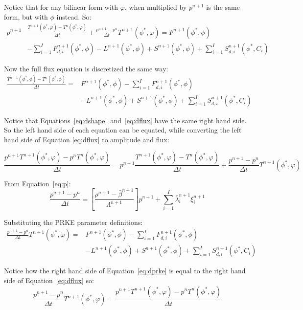 \documentclass[11pt]{tamurmemo}
\newcommand{\be}{\begin{equation}}
\newcommand{\ee}{\end{equation}}
\begin{document}
Notice that for any bilinear form with $\varphi$, when multiplied by $p^{n+1}$ is the same form, but with $\phi$ instead. So:
\begin{align}
p^{n+1}&\frac{T^{n+1}(\phi^{*},\varphi)-T^{n}(\phi^{*},\varphi)}{\Delta t} + \frac{p^{n+1} - p^n}{\Delta t}T^{n+1}(\phi^{*},\varphi)= F^{n+1}(\phi^{*},\phi)  \nonumber \\
&- \sum_{i=1}^I F_{d,i}^{n+1}(\phi^{*},\phi) - L^{n+1}(\phi^{*},\phi) + S^{n+1}(\phi^{*},\phi) + \sum_{i=1}^I S_{d,i}^{n+1}(\phi^{*},C_i)
\label{eq:dshape}
\end{align}

Now the full flux equation is discretized the same way:
\begin{align}
\frac{T^{n+1}(\phi^{*},\phi)-T^{n}(\phi^{*},\phi)}{\Delta t} =& F^{n+1}(\phi^{*},\phi)- \sum_{i=1}^I F_{d,i}^{n+1}(\phi^{*},\phi) \nonumber \\
& - L^{n+1}(\phi^{*},\phi) + S^{n+1}(\phi^{*},\phi) + \sum_{i=1}^I S_{d,i}^{n+1}(\phi^{*},C_i)
\label{eq:dflux}
\end{align}

Notice that Equations~\ref{eq:dshape}~and~\ref{eq:dflux} have the same right hand side. So the left hand side of each equation can be equated, while converting the left hand side of Equation \ref{eq:dflux} to amplitude and flux:

\be
\frac{p^{n+1}T^{n+1}(\phi^{*},\varphi)-p^nT^{n}(\phi^{*},\varphi)}{\Delta t} = p^{n+1}\frac{T^{n+1}(\phi^{*},\varphi)-T^{n}(\phi^{*},\varphi)}{\Delta t} + \frac{p^{n+1} - p^n}{\Delta t}T^{n+1}(\phi^{*},\varphi)
\label{eq:neq}
\ee

From Equation~\ref{eq:p}:
\be
\frac{p^{n+1} - p^n}{\Delta t} = \left[\frac{\rho^{n+1}-\bar{\beta}^{n+1}}{\Lambda^{n+1}}\right]p^{n+1}+\sum_{i=1}^I\bar{\lambda}_i^{n+1}\xi_i^{n+1}
\ee

Substituting the PRKE parameter definitions:
\begin{align}
\frac{p^{n+1} - p^n}{\Delta t} T^{n+1}(\phi^{*},\varphi) =& F^{n+1}(\phi^{*},\phi)- \sum_{i=1}^I F_{d,i}^{n+1}(\phi^{*},\phi) \nonumber \\
& - L^{n+1}(\phi^{*},\phi) + S^{n+1}(\phi^{*},\phi) + \sum_{i=1}^I S_{d,i}^{n+1}(\phi^{*},C_i)
\label{eq:dprke}
\end{align}

Notice how the right hand side of Equation~\ref{eq:dprke} is equal to the right hand side of Equation~\ref{eq:dflux} so:
\be
\frac{p^{n+1} - p^n}{\Delta t} T^{n+1}(\phi^{*},\varphi) = \frac{p^{n+1}T^{n+1}(\phi^{*},\varphi)-p^nT^{n}(\phi^{*},\varphi)}{\Delta t}
\ee
\end{document}
